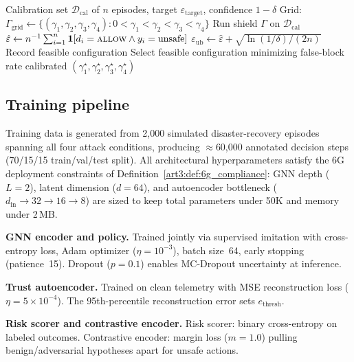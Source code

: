 \begin{algorithm}[t]
\caption{Shield threshold calibration}
\label{art3:alg:calibration}
\begin{algorithmic}[1]
\Require Calibration set $\mathcal{D}_{\mathrm{cal}}$ of $n$ episodes, target $\varepsilon_{\mathrm{target}}$, confidence $1-\delta$
\State Grid: $\Gamma_{\mathrm{grid}} \gets \{(\gamma_1,\gamma_2,\gamma_3,\gamma_4) : 0 < \gamma_1 < \gamma_2 < \gamma_3 < \gamma_4\}$
    \State Run shield $\Gamma$ on $\mathcal{D}_{\mathrm{cal}}$
    \State $\hat{\varepsilon} \gets n^{-1}\sum_{i=1}^{n} \mathbf{1}[d_i = \textsc{allow} \wedge y_i = \text{unsafe}]$
    \State $\varepsilon_{\mathrm{ub}} \gets \hat{\varepsilon} + \sqrt{\ln(1/\delta)/(2n)}$
        \State Record feasible configuration
    \EndIf
\EndFor
\State Select feasible configuration minimizing false-block rate
\State \Return calibrated $(\gamma_1^\star, \gamma_2^\star, \gamma_3^\star, \gamma_4^\star)$
\end{algorithmic}
\end{algorithm}


\subsection{Training pipeline}
\label{art3:sec:training_pipeline}

Training data is generated from 2,000 simulated disaster-recovery episodes spanning all four attack conditions, producing $\approx$60,000 annotated decision steps (70/15/15 train/val/test split).
All architectural hyperparameters satisfy the 6G deployment constraints of Definition~\ref{art3:def:6g_compliance}: GNN depth ($L=2$), latent dimension ($d=64$), and autoencoder bottleneck ($d_{\mathrm{in}} \to 32 \to 16 \to 8$) are sized to keep total parameters under 50K and memory under 2\,MB.

\noindent\textbf{GNN encoder and policy.}
Trained jointly via supervised imitation with cross-entropy loss, Adam optimizer ($\eta=10^{-3}$), batch size~64, early stopping (patience~15).
Dropout ($p=0.1$) enables MC-Dropout uncertainty at inference.

\noindent\textbf{Trust autoencoder.}
Trained on clean telemetry with MSE reconstruction loss ($\eta=5\times10^{-4}$).
The 95th-percentile reconstruction error sets $e_{\mathrm{thresh}}$.

\noindent\textbf{Risk scorer and contrastive encoder.}
Risk scorer: binary cross-entropy on labeled outcomes.
Contrastive encoder: margin loss ($m=1.0$) pulling benign/adversarial hypotheses apart for unsafe actions.

